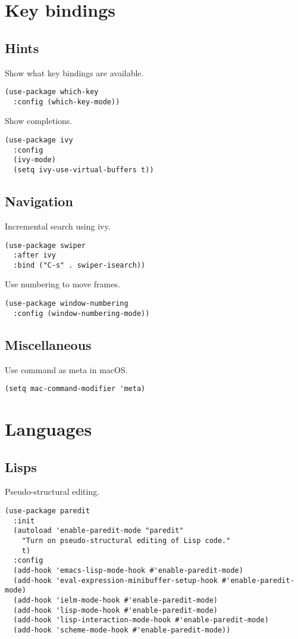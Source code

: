 \documentclass[11pt]{article}
\begin{document}
\section{Key bindings}
\label{sec:org624eda0}
\subsection{Hints}
\label{sec:orgb458384}
Show what key bindings are available.
\begin{verbatim}
(use-package which-key
  :config (which-key-mode))
\end{verbatim}

Show completions.
\begin{verbatim}
(use-package ivy
  :config
  (ivy-mode)
  (setq ivy-use-virtual-buffers t))
\end{verbatim}

\subsection{Navigation}
\label{sec:orgbb36a9d}
Incremental search using ivy.
\begin{verbatim}
(use-package swiper
  :after ivy
  :bind ("C-s" . swiper-isearch))
\end{verbatim}

Use numbering to move frames.
\begin{verbatim}
(use-package window-numbering
  :config (window-numbering-mode))
\end{verbatim}

\subsection{Miscellaneous}
\label{sec:org9ab60b2}
Use command as meta in macOS.
\begin{verbatim}
(setq mac-command-modifier 'meta)
\end{verbatim}

\section{Languages}
\label{sec:orgfee4fd8}
\subsection{Lisps}
\label{sec:org89f1d8c}
Pseudo-structural editing.
\begin{verbatim}
(use-package paredit
  :init
  (autoload 'enable-paredit-mode "paredit"
    "Turn on pseudo-structural editing of Lisp code."
    t)
  :config
  (add-hook 'emacs-lisp-mode-hook #'enable-paredit-mode)
  (add-hook 'eval-expression-minibuffer-setup-hook #'enable-paredit-mode)
  (add-hook 'ielm-mode-hook #'enable-paredit-mode)
  (add-hook 'lisp-mode-hook #'enable-paredit-mode)
  (add-hook 'lisp-interaction-mode-hook #'enable-paredit-mode)
  (add-hook 'scheme-mode-hook #'enable-paredit-mode))
\end{verbatim}
\end{document}
